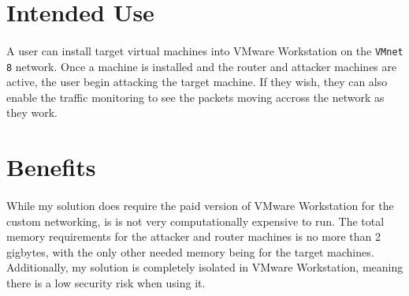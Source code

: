 \documentclass{article}
\begin{document}
\section{Intended Use}

\paragraph{}
A user can install target virtual machines into VMware Workstation on the \texttt{VMnet 8} network.
Once a machine is installed and the router and attacker machines are active, the user begin attacking the target machine. If they wish, they can also enable the traffic monitoring to see the packets moving accross the network as they work.

\section{Benefits}

\paragraph{}
While my solution does require the paid version of VMware Workstation for the custom networking, is is not very computationally expensive to run. The total memory requirements for the attacker and router machines is no more than 2 gigbytes, with the only other needed memory being for the target machines.
Additionally, my solution is completely isolated in VMware Workstation, meaning there is a low security risk when using it.
\end{document}
